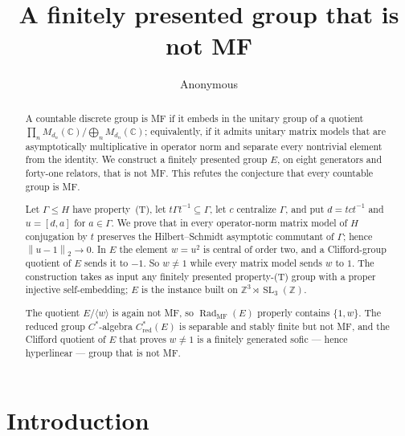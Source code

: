 \documentclass[11pt]{amsart}
\newcommand{\paperauthor}{Anonymous}
\theoremstyle{definition}
\theoremstyle{remark}
\theoremstyle{plain}
\newcommand{\SL}{\operatorname{SL}}
\newcommand{\Cred}{C^*_{\mathrm{red}}}
\newcommand{\hsnorm}[1]{\left\lVert #1\right\rVert_{2}}
\begin{document}
\title[A finitely presented group that is not MF]{A finitely presented group that is not MF}
\author{\paperauthor}

\begin{abstract}
A countable discrete group is MF if it embeds in the unitary group of a
quotient $\prod_nM_{d_n}(\mathbb C)/\bigoplus_nM_{d_n}(\mathbb C)$;
equivalently, if it admits unitary matrix models that are asymptotically
multiplicative in operator norm and separate every nontrivial element
from the identity.  We construct a finitely presented group $E$, on
eight generators and forty-one relators, that is not MF\@.  This refutes
the conjecture that every countable group is MF.

Let $\Gamma\le H$ have property~\textup{(T)}, let $t\Gamma
t^{-1}\subseteq\Gamma$, let $c$ centralize $\Gamma$, and put
$d=tct^{-1}$ and $u=[d,a]$ for $a\in\Gamma$.  We prove that in every
operator-norm matrix model of $H$ conjugation by $t$ preserves the
Hilbert--Schmidt asymptotic commutant of $\Gamma$; hence
$\hsnorm{u-1}\to0$.  In $E$ the element $w=u^2$ is central of order
two, and a Clifford-group quotient of $E$ sends it to $-1$.  So $w\ne1$
while every matrix model sends $w$ to $1$.  The construction takes as
input any finitely presented property-\textup{(T)} group with a proper
injective self-embedding; $E$ is the instance built on
$\mathbb Z^3\rtimes\SL_3(\mathbb Z)$.

The quotient $E/\langle w\rangle$ is again not MF, so
$\operatorname{Rad}_{\mathrm{MF}}(E)$ properly contains $\{1,w\}$.  The
reduced group $C^*$-algebra $\Cred(E)$ is separable and stably finite
but not MF, and the Clifford quotient of $E$ that proves $w\ne1$ is a
finitely generated sofic --- hence hyperlinear --- group that is not MF.

\end{abstract}

\maketitle
\section{Introduction}\label{sec:intro}
\end{document}
